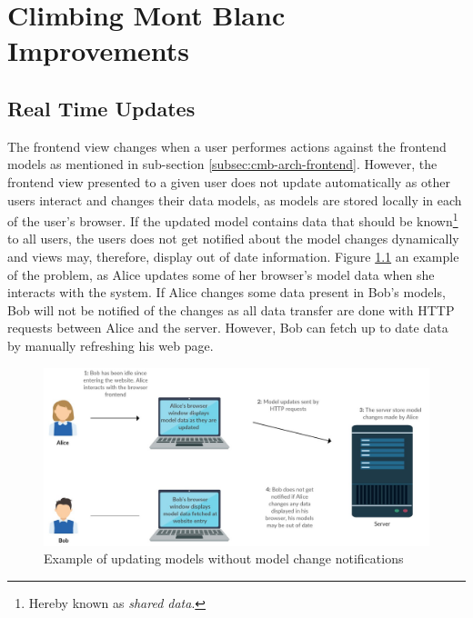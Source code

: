 \chapter{Climbing Mont Blanc Improvements}
\label{ch:improvements}


\section{Real Time Updates}
\label{sec:real-time}
The frontend view changes when a user performes actions against the frontend models as mentioned in sub-section \ref{subsec:cmb-arch-frontend}. However, the frontend view presented to a given user does not update automatically as other users interact and changes their data models, as models are stored locally in each of the user’s browser. If the updated model contains data that should be known\footnote{Hereby known as \textit{shared data}.} to all users, the users does not get notified about the model changes dynamically and views may, therefore, display out of date information. Figure \ref{fig:update-problem} an example of the problem, as Alice updates some of her browser’s model data when she interacts with the system. If Alice changes some data present in Bob’s models, Bob will not be notified of the changes as all data transfer are done with HTTP requests between Alice and the server. However, Bob can fetch up to date data by manually refreshing his web page. \\

\begin{figure}
    \centering
    \includegraphics[width=1\textwidth]{figs/update_problem.jpg}
    \caption{Example of updating models without model change notifications}
    \label{fig:update-problem}
\end{figure}

